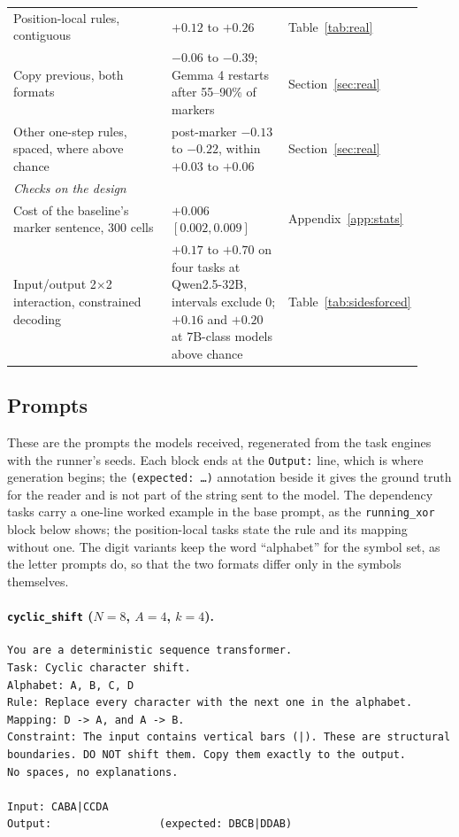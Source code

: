 \documentclass[10pt]{article} %
\newcommand{\task}[1]{\texttt{#1}}
\begin{document}
\begin{table}[!htbp]
\begin{tabular}{p{0.43\linewidth} p{0.30\linewidth} p{0.19\linewidth}}
Position-local rules, contiguous & $+0.12$ to $+0.26$ & Table~\ref{tab:real} \\
Copy previous, both formats & $-0.06$ to $-0.39$; Gemma 4 restarts after 55--90\% of markers & Section~\ref{sec:real} \\
Other one-step rules, spaced, where above chance & post-marker $-0.13$ to $-0.22$, within $+0.03$ to $+0.06$ & Section~\ref{sec:real} \\
\midrule
\multicolumn{3}{l}{\emph{Checks on the design}} \\
Cost of the baseline's marker sentence, 300 cells & $+0.006$ $[0.002, 0.009]$ & Appendix~\ref{app:stats} \\
Input/output 2$\times$2 interaction, constrained decoding & $+0.17$ to $+0.70$ on four tasks at Qwen2.5-32B, intervals exclude 0; $+0.16$ and $+0.20$ at 7B-class models above chance & Table~\ref{tab:sidesforced} \\
\bottomrule
\end{tabular}
\end{table}

\FloatBarrier

\subsection{Prompts}
\label{app:prompts}

These are the prompts the models received, regenerated from the task engines with the runner's seeds. Each block ends at the \texttt{Output:} line, which is where generation begins; the \texttt{(expected: \ldots)} annotation beside it gives the ground truth for the reader and is not part of the string sent to the model. The dependency tasks carry a one-line worked example in the base prompt, as the \task{running\_xor} block below shows; the position-local tasks state the rule and its mapping without one. The digit variants keep the word ``alphabet'' for the symbol set, as the letter prompts do, so that the two formats differ only in the symbols themselves.

\paragraph{\task{cyclic\_shift} ($N = 8$, $A = 4$, $k = 4$).}
\begin{small}
\begin{verbatim}
You are a deterministic sequence transformer.
Task: Cyclic character shift.
Alphabet: A, B, C, D
Rule: Replace every character with the next one in the alphabet.
Mapping: D -> A, and A -> B.
Constraint: The input contains vertical bars (|). These are structural
boundaries. DO NOT shift them. Copy them exactly to the output.
No spaces, no explanations.

Input: CABA|CCDA
Output:                 (expected: DBCB|DDAB)
\end{verbatim}
\end{small}
\end{document}
